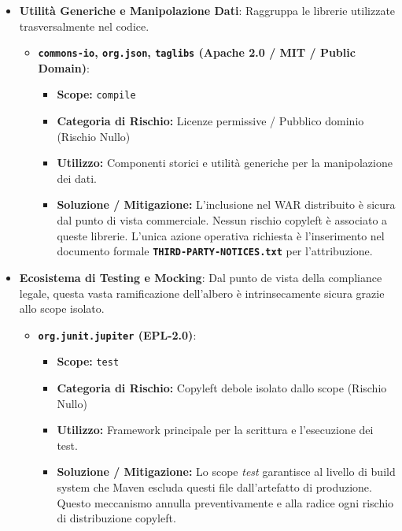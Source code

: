 \begin{itemize}
    \item \textbf{Utilità Generiche e Manipolazione Dati}:
    Raggruppa le librerie utilizzate trasversalmente nel codice.
    \begin{itemize}
        \item \textbf{\texttt{commons-io}, \texttt{org.json}, \texttt{taglibs} (Apache 2.0 / MIT / Public Domain)}:
        \begin{itemize}
            \item \textbf{Scope:} \texttt{compile}
            \item \textbf{Categoria di Rischio:} Licenze permissive / Pubblico dominio (Rischio Nullo)
            \item \textbf{Utilizzo:} Componenti storici e utilità generiche per la manipolazione dei dati.
            \item \textbf{Soluzione / Mitigazione:} L'inclusione nel WAR distribuito è sicura dal punto di vista commerciale. Nessun rischio copyleft è associato a queste librerie. L'unica azione operativa richiesta è l'inserimento nel documento formale \textbf{\texttt{THIRD-PARTY-NOTICES.txt}} per l'attribuzione.
        \end{itemize}
    \end{itemize}
    
    \item \textbf{Ecosistema di Testing e Mocking}:
    Dal punto de vista della compliance legale, questa vasta ramificazione dell'albero è intrinsecamente sicura grazie allo scope isolato.
    \begin{itemize}
        \item \textbf{\texttt{org.junit.jupiter} (EPL-2.0)}:
        \begin{itemize}
            \item \textbf{Scope:} \texttt{test}
            \item \textbf{Categoria di Rischio:} Copyleft debole isolato dallo scope (Rischio Nullo)
            \item \textbf{Utilizzo:} Framework principale per la scrittura e l'esecuzione dei test.
            \item \textbf{Soluzione / Mitigazione:} Lo scope \textit{test} garantisce al livello di build system che Maven escluda questi file dall'artefatto di produzione. Questo meccanismo annulla preventivamente e alla radice ogni rischio di distribuzione copyleft.
        \end{itemize}
        

\end{itemize}
\end{itemize}
